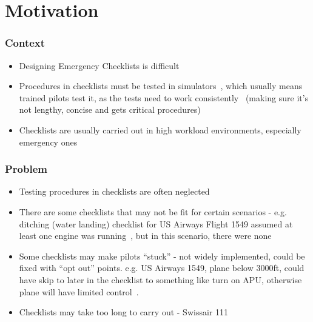 \documentclass[../dissertation.tex]{subfiles}
\begin{document}
\section{Motivation}
\subsubsection*{Context}
\begin{itemize}
    \item Designing Emergency Checklists is difficult
    \item Procedures in checklists must be tested in simulators~\cite{nasa-design},
      which usually means trained pilots test it, as the tests need
      to work consistently~\cite{manifesto} (making sure it's not lengthy,
      concise and gets critical procedures)
    \item Checklists are usually carried out in high
        workload environments, especially emergency ones
\end{itemize}

\subsubsection*{Problem}
\begin{itemize}
  \item Testing procedures in checklists are often neglected~\cite{nasa-design}
    \item There are some checklists that may not be fit
        for certain scenarios - e.g. ditching (water landing)
        checklist for US Airways Flight 1549 assumed at least one engine
        was running~\cite{AWE1549}, but in this scenario, there were none
    \item Some checklists may make pilots \enquote{stuck}
      - not widely implemented, could be fixed with \enquote{opt out} points.
      e.g. US Airways 1549, plane below 3000ft, could have skip to
      later in the checklist to something like turn on APU, otherwise plane
      will have limited control~\cite{AWE1549}.
    \item Checklists may take too long to carry out - Swissair 111
\end{itemize}
\end{document}
